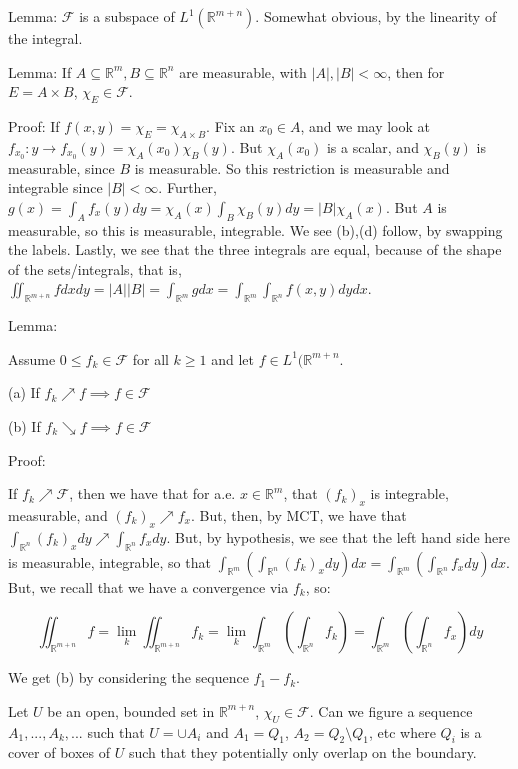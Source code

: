 \documentclass[10pt]{article}
\begin{document}
Lemma: $\mathcal{F}$ is a subspace of $L^1(\mathbb{R}^{m+n})$. Somewhat obvious, by the linearity of the integral.

Lemma: If $A \subseteq \mathbb{R}^m, B \subseteq \mathbb{R}^n$ are measurable, with $|A|, |B| < \infty$, then for $E = A \times B$, $\chi_E \in \mathcal{F}$.

Proof: If $f(x,y) = \chi_E = \chi_{A \times B}$. Fix an $x_0 \in A$, and we may look at $f_{x_0}: y \to f_{x_0}(y)  = \chi_A(x_0) \chi_B(y)$. But $\chi_A(x_0)$ is a scalar, and $\chi_B(y)$ is measurable, since $B$ is measurable. So this restriction is measurable and integrable since $|B| < \infty$. Further, $g(x) = \int_A f_x(y) dy = \chi_A(x) \int_B \chi_B(y) dy = |B| \chi_A(x)$. But $A$ is measurable, so this is measurable, integrable. We see (b),(d) follow, by swapping the labels. Lastly, we see that the three integrals are equal, because of the shape of the sets/integrals, that is, $\iint_{\mathbb{R}^{m+n}} f dx dy = |A| |B| = \int_{\mathbb{R}^m} g dx = \int_{\mathbb{R}^m} \int_{\mathbb{R}^n} f(x,y) dy dx$.

Lemma:

Assume $0 \leq f_k \in \mathcal{F}$ for all $k \geq 1$ and let $f \in L^1(\mathbb{R}^{m+n}$.

(a) If $f_k \nearrow f \implies f \in \mathcal{F}$

(b) If $f_k \searrow f \implies f \in \mathcal{F}$

Proof: 

If $f_k \nearrow \mathcal{F}$, then we have that for a.e. $x\in \mathbb{R}^m$, that $(f_k)_x$ is integrable, measurable, and $(f_k)_x \nearrow f_x$. But, then, by MCT, we have that $\int_{\mathbb{R}^n} (f_k)_x dy \nearrow \int_{\mathbb{R}^n} f_x dy$. But, by hypothesis, we see that the left hand side here is measurable, integrable, so that $\int_{\mathbb{R}^m} (\int_{\mathbb{R}^n} (f_k)_x dy) dx = \int_{\mathbb{R}^m} (\int_{\mathbb{R}^n} f_x dy) dx$. But, we recall that we have a convergence via $f_k$, so:

$$\iint_{\mathbb{R}^{m+n}} f = \lim_k \iint_{\mathbb{R}^{m+n}} f_k = \lim_k \int_{\mathbb{R}^m} (\int_{\mathbb{R}^n} f_k) = \int_{\mathbb{R}^m} (\int_{\mathbb{R}^n} f_x) dy $$

We get (b) by considering the sequence $f_1 - f_k$.

Let $U$ be an open, bounded set in $\mathbb{R}^{m+n}$, $\chi_{U} \in \mathcal{F}$. Can we figure a sequence $A_1,...,A_k,...$ such that $U = \cup A_i$ and $A_1 = Q_1$, $A_2 = Q_2 \setminus Q_1$, etc where $Q_i$ is a cover of boxes of $U$ such that they potentially only overlap on the boundary.
\end{document}
